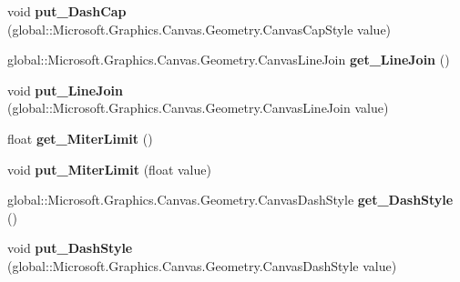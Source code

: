 \begin{DoxyCompactItemize}
void {\bfseries put\+\_\+\+Dash\+Cap} (global\+::\+Microsoft.\+Graphics.\+Canvas.\+Geometry.\+Canvas\+Cap\+Style value)
\item 
\mbox{\label{class_microsoft_1_1_graphics_1_1_canvas_1_1_geometry_1_1_canvas_stroke_style_af2b4659e4328e98df4216b6cfc29404c}} 
global\+::\+Microsoft.\+Graphics.\+Canvas.\+Geometry.\+Canvas\+Line\+Join {\bfseries get\+\_\+\+Line\+Join} ()
\item 
\mbox{\label{class_microsoft_1_1_graphics_1_1_canvas_1_1_geometry_1_1_canvas_stroke_style_a112f794308a583b16c6b52a845430a94}} 
void {\bfseries put\+\_\+\+Line\+Join} (global\+::\+Microsoft.\+Graphics.\+Canvas.\+Geometry.\+Canvas\+Line\+Join value)
\item 
\mbox{\label{class_microsoft_1_1_graphics_1_1_canvas_1_1_geometry_1_1_canvas_stroke_style_a999cba5c52b4a29dc17175ce7f226aec}} 
float {\bfseries get\+\_\+\+Miter\+Limit} ()
\item 
\mbox{\label{class_microsoft_1_1_graphics_1_1_canvas_1_1_geometry_1_1_canvas_stroke_style_ad0733f31456bf9ae960760a481eb54a5}} 
void {\bfseries put\+\_\+\+Miter\+Limit} (float value)
\item 
\mbox{\label{class_microsoft_1_1_graphics_1_1_canvas_1_1_geometry_1_1_canvas_stroke_style_ab7a77fa7925c62bfceb8ec4a9ffed0a2}} 
global\+::\+Microsoft.\+Graphics.\+Canvas.\+Geometry.\+Canvas\+Dash\+Style {\bfseries get\+\_\+\+Dash\+Style} ()
\item 
\mbox{\label{class_microsoft_1_1_graphics_1_1_canvas_1_1_geometry_1_1_canvas_stroke_style_a58b2ea381cdec6b425c64655ffe06924}} 
void {\bfseries put\+\_\+\+Dash\+Style} (global\+::\+Microsoft.\+Graphics.\+Canvas.\+Geometry.\+Canvas\+Dash\+Style value)
\item 
\mbox{\label{class_microsoft_1_1_graphics_1_1_canvas_1_1_geometry_1_1_canvas_stroke_style_ad6a5cdd86562a8dfdb8e856ccf7227dc}} 

\end{DoxyCompactItemize}
